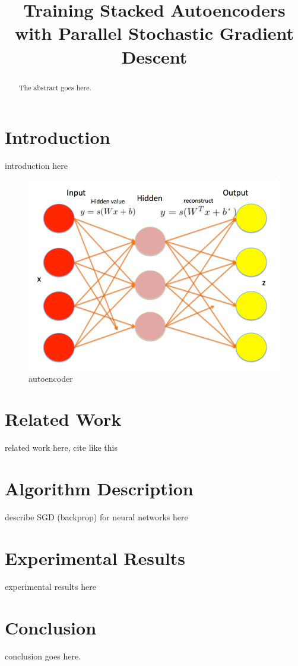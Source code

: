 \documentclass[conference]{IEEEtran}
\begin{document}
\title{Training Stacked Autoencoders with Parallel Stochastic Gradient Descent}

\author{
\and
{}
}

\maketitle

\begin{abstract}
The abstract goes here.
\end{abstract}

\section{Introduction}
introduction here

\begin{figure}[h]
\centering
\includegraphics[width=0.9\linewidth]{autoencoder.png}
\caption{autoencoder}
\end{figure}

\section{Related Work}
related work here, cite like this \cite{vincent2010stacked}

\section{Algorithm Description}
describe SGD (backprop) for neural networks here

\section{Experimental Results}
experimental results here

\section{Conclusion}
conclusion goes here.



\end{document}
